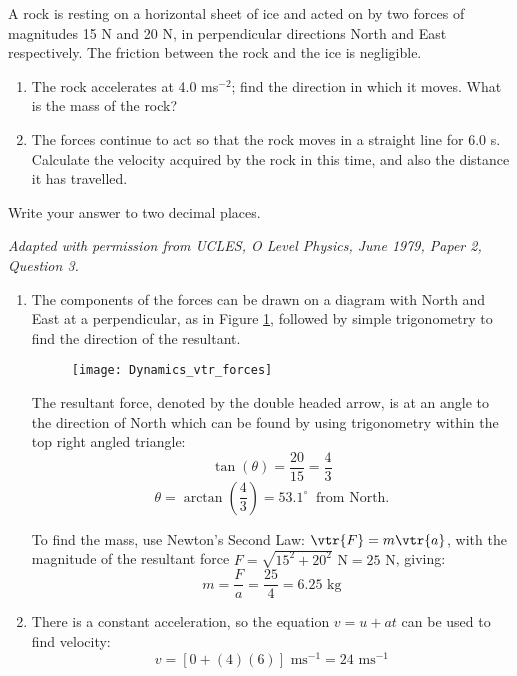
\begin{problem}[O1979PIIQ3a]
{A rock is resting on a horizontal sheet of ice and acted on by two forces of magnitudes 15 N and 20 N, in perpendicular directions North and East respectively. The friction between the rock and the ice is negligible.
\begin{enumerate}
	\item The rock accelerates at 4.0 ms$^{-2}$; find the direction in which it moves. What is the mass of the rock?
	\item The forces continue to act so that the rock moves in a straight line for 6.0 s. Calculate the velocity acquired by the rock in this time, and also the distance it has travelled.
\end{enumerate}
Write your answer to two decimal places.} 
{\textit{Adapted with permission from UCLES, O Level Physics, June 1979, Paper 2, Question 3.}}
{\begin{enumerate}
	\item The components of the forces can be drawn on a diagram with North and East at a perpendicular, as in Figure \ref{fig:Dynamics_vtr_forces}, followed by simple trigonometry to find the direction of the resultant. 
\begin{figure}[h]
	\centering
	\texttt{[image: Dynamics\_vtr\_forces]}
	\caption{}
	\label{fig:Dynamics_vtr_forces}
\end{figure}

The resultant force, denoted by the double headed arrow, is at an angle to the direction of North which can be found by using trigonometry within the top right angled triangle:
	\begin{equation*}\tan(\theta)=\frac{20}{15} = \frac{4}{3} \end{equation*}
	\begin{equation*}\theta = \arctan\left(\frac{4}{3}\right) = 53.1^{\circ} \:\textrm{ from North.}\end{equation*}

To find the mass, use Newton's Second Law: $\vtr{F} = m\vtr{a}$, with the magnitude of the resultant force $F = \sqrt{15^{2} + 20^{2}} \textrm{ N} = 25 \textrm{ N}$, giving: 
\begin{equation*}m = \frac{F}{a} = \frac{25}{4} = 6.25 \textrm{ kg} \end{equation*}
	\item There is a constant acceleration, so the equation $v = u + at$ can be used to find velocity: 
	\begin{equation*} v = [0 + (4)(6)] \textrm{ ms}^{-1} = 24 \textrm{ ms}^{-1} \end{equation*}


\end{enumerate}}
\end{problem}
